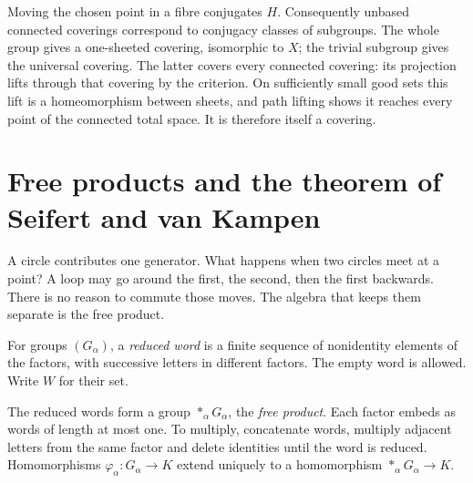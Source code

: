 Moving the chosen point in a fibre conjugates $H$. Consequently unbased connected coverings correspond to conjugacy classes of subgroups. The whole group gives a one-sheeted covering, isomorphic to $X$; the trivial subgroup gives the universal covering. The latter covers every connected covering: its projection lifts through that covering by the criterion. On sufficiently small good sets this lift is a homeomorphism between sheets, and path lifting shows it reaches every point of the connected total space. It is therefore itself a covering.

\section{Free products and the theorem of Seifert and van Kampen}

A circle contributes one generator. What happens when two circles meet at a point? A loop may go around the first, the second, then the first backwards. There is no reason to commute those moves. The algebra that keeps them separate is the free product.

For groups $(G_\alpha)$, a \emph{reduced word} is a finite sequence of nonidentity elements of the factors, with successive letters in different factors. The empty word is allowed. Write $W$ for their set.

\begin{proposition}\label{prop:freeproduct}
The reduced words form a group $\mathop{\ast}_\alpha G_\alpha$, the \emph{free product}. Each factor embeds as words of length at most one. To multiply, concatenate words, multiply adjacent letters from the same factor and delete identities until the word is reduced. Homomorphisms $\varphi_\alpha:G_\alpha\to K$ extend uniquely to a homomorphism $\mathop{\ast}_\alpha G_\alpha\to K$.
\end{proposition}

